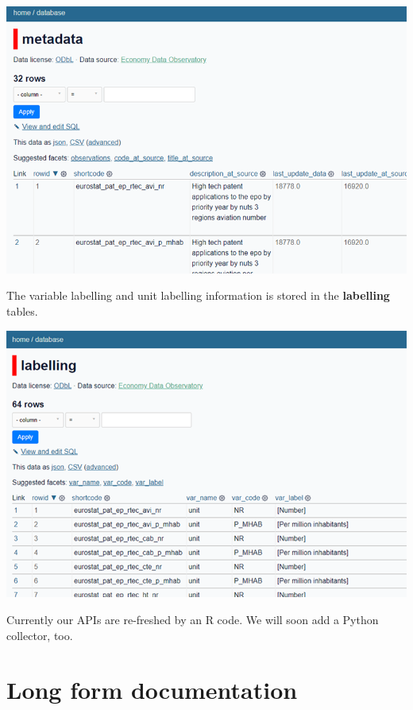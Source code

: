 \documentclass[
  a4paper,
  openany, a4paper, oneside]{book}
\begin{document}
\begin{center}\includegraphics[width=11.11in]{plots/screenshots/EDO_API_metadata_table} \end{center}

The variable labelling and unit labelling information is stored in the \textbf{labelling} tables.

\begin{center}\includegraphics[width=11.11in]{plots/screenshots/EDO_API_labelling_table} \end{center}

Currently our APIs are re-freshed by an R code. We will soon add a Python collector, too.

\hypertarget{bookdown}{%
\section{Long form documentation}\label{bookdown}}
\end{document}
